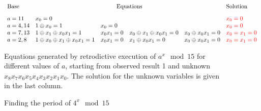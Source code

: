 \documentclass[sigplan]{acmart}
\newcommand{\red}[1]{{\color{red}{#1}}}
\begin{document}
\begin{figure}
\[\begin{array}{l@{\quad}lllll}
\textrm{Base} & \multicolumn{4}{c}{\textrm{Equations}} & \textrm{Solution} \\[2ex]
a=11 & x_0 = 0 &&&& \red{x_0 = 0} \\
a=4,14 & 1 \oplus x_0 = 1 & x_0 = 0 &&
  & \red{x_0 = 0} \\
a=7,13 & 1 \oplus x_1 \oplus x_0x_1 = 1 & x_0x_1 = 0 & x_0 \oplus x_1 \oplus x_0x_1 = 0 &  x_0 \oplus x_0x_1 = 0 & \red{x_0=x_1=0} \\
a=2,8 & 1 \oplus x_0 \oplus x_1 \oplus x_0x_1 = 1 & x_0x_1 = 0 & x_1 \oplus x_0x_1 = 0 & x_0 \oplus x_0x_1 = 0  & \red{x_0=x_1=0}
\end{array}\]
\caption{\label{fig:shor-eqs}Equations generated by retrodictive
  execution of $a^x \mod{15}$ for different values of $a$, starting
  from observed result 1 and unknown
  $x_8x_7x_6x_5x_4x_3x_2x_1x_0$. The solution for the unknown
  variables is given in the last column.}
\end{figure}
\begin{wrapfigure}{r}{7cm}
\begin{center}
\end{center}
\caption{\label{fig:shor15}Finding the period of $4^x \mod{15}$}
\end{wrapfigure}
\end{document}
